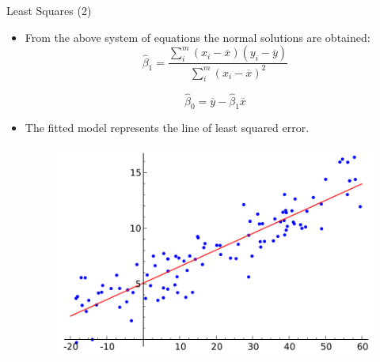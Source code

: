 \documentclass[handout]{beamer}
\begin{document}
\begin{frame}{Least Squares (2)}
\scriptsize{
\begin{itemize}
 \item From the above system of equations the normal solutions are obtained:
  \begin{equation}
 \hat{\beta}_{1} = \frac{\sum_{i}^{m} (x_i-\overline{x})(y_i-\overline{y}) }{ \sum_{i}^{m} (x_i-\overline{x})^2}    
 \end{equation}

 \begin{equation}
 \hat{\beta}_{0} = \overline{y} -\hat{\beta}_{1}\overline{x}    
 \end{equation}



\item The fitted model represents the line of least squared error.

\begin{figure}[h!]
	\centering
	\includegraphics[scale=0.35]{pics/Linear_regression.png}
\end{figure}

\end{itemize}

} 
 
\end{frame}
\end{document}
